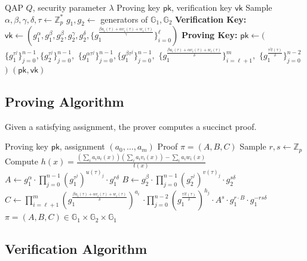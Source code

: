 \documentclass[11pt,a4paper]{article}
\newcommand{\G}{\mathbb{G}}
\newcommand{\Z}{\mathbb{Z}}
\begin{document}
\begin{algorithm}
\caption{Groth16 Setup}
\label{alg:setup}
\begin{algorithmic}[1]
\Require QAP $Q$, security parameter $\lambda$
\Ensure Proving key $\mathsf{pk}$, verification key $\mathsf{vk}$
\State Sample $\alpha, \beta, \gamma, \delta, \tau \gets \Z_p^*$
\State $g_1, g_2 \gets$ generators of $\G_1, \G_2$
\State \textbf{Verification Key:}
\State $\mathsf{vk} \gets (g_1^\alpha, g_1^\beta, g_2^\beta, g_2^\gamma, g_2^\delta, \{g_1^{\frac{\beta u_i(\tau) + \alpha v_i(\tau) + w_i(\tau)}{\gamma}}\}_{i=0}^\ell)$
\State \textbf{Proving Key:}
\State $\mathsf{pk} \gets ($
\State \quad $\{g_1^{\tau^j}\}_{j=0}^{n-1}, \{g_2^{\tau^j}\}_{j=0}^{n-1},$
\State \quad $\{g_1^{\alpha \tau^j}\}_{j=0}^{n-1}, \{g_1^{\beta \tau^j}\}_{j=0}^{n-1},$
\State \quad $\{g_1^{\frac{\beta u_i(\tau) + \alpha v_i(\tau) + w_i(\tau)}{\delta}}\}_{i=\ell+1}^m,$
\State \quad $\{g_1^{\frac{\tau^j t(\tau)}{\delta}}\}_{j=0}^{n-2}$
\State $)$
\State \Return $(\mathsf{pk}, \mathsf{vk})$
\end{algorithmic}
\end{algorithm}

\subsection{Proving Algorithm}

Given a satisfying assignment, the prover computes a succinct proof.

\begin{algorithm}
\caption{Groth16 Prove}
\label{alg:prove}
\begin{algorithmic}[1]
\Require Proving key $\mathsf{pk}$, assignment $(a_0, \ldots, a_m)$
\Ensure Proof $\pi = (A, B, C)$
\State Sample $r, s \gets \Z_p$
\State Compute $h(x) = \frac{(\sum_i a_i u_i(x))(\sum_i a_i v_i(x)) - \sum_i a_i w_i(x)}{t(x)}$
\State $A \gets g_1^\alpha \cdot \prod_{j=0}^{n-1} (g_1^{\tau^j})^{u(\tau)_j} \cdot g_1^{r\delta}$
\State $B \gets g_2^\beta \cdot \prod_{j=0}^{n-1} (g_2^{\tau^j})^{v(\tau)_j} \cdot g_2^{s\delta}$
\State $C \gets \prod_{i=\ell+1}^m (g_1^{\frac{\beta u_i(\tau) + \alpha v_i(\tau) + w_i(\tau)}{\delta}})^{a_i}$
\State \quad $\cdot \prod_{j=0}^{n-2} (g_1^{\frac{\tau^j t(\tau)}{\delta}})^{h_j} \cdot A^s \cdot g_1^{r \cdot B} \cdot g_1^{-rs\delta}$
\State \Return $\pi = (A, B, C) \in \G_1 \times \G_2 \times \G_1$
\end{algorithmic}
\end{algorithm}

\subsection{Verification Algorithm}
\end{document}
